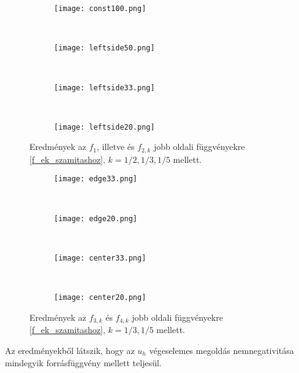 \begin{figure}[ht]
	\begin{subfigure}{.5\textwidth}
		\centerline{\texttt{[image: const100.png]}}
		\label{fig:linu2d}
	\end{subfigure}
	~
	\begin{subfigure}{.5\textwidth}
		\centerline{\texttt{[image: leftside50.png]}}
		\label{fig:linu2d}
	\end{subfigure}
	\\
	\begin{subfigure}{.5\textwidth}
		\centerline{\texttt{[image: leftside33.png]}}
		\label{fig:linu2d}
	\end{subfigure}
	~
	\begin{subfigure}{.5\textwidth}
		\centerline{\texttt{[image: leftside20.png]}}
		\label{fig:linu2d}
	\end{subfigure}
	\caption{Eredmények az $f_1$, illetve és $f_{2,k}$ jobb oldali függvényekre \eqref{f_ek_szamitashoz}, $k = 1/2, 1/3, 1/5$ mellett.}
	\label{fig:f12eredmeny}
\end{figure}

\begin{figure}[ht]
	\begin{subfigure}{.5\textwidth}
		\centerline{\texttt{[image: edge33.png]}}
		\label{fig:linu2d}
	\end{subfigure}
	~
	\begin{subfigure}{.5\textwidth}
		\centerline{\texttt{[image: edge20.png]}}
		\label{fig:linu2d}
	\end{subfigure}
	\\
	\begin{subfigure}{.5\textwidth}
		\centerline{\texttt{[image: center33.png]}}
		\label{fig:linu2d}
	\end{subfigure}
	~
	\begin{subfigure}{.5\textwidth}
		\centerline{\texttt{[image: center20.png]}}
		\label{fig:linu2d}
	\end{subfigure}
	\caption{Eredmények az $f_{3,k}$ és $f_{4,k}$ jobb oldali függvényekre \eqref{f_ek_szamitashoz}, $k = 1/3, 1/5$ mellett.}
	\label{fig:f34eredmeny}
\end{figure}


Az eredményekből látszik, hogy az $u_h$ végeselemes megoldás nemnegativitása mindegyik forrásfüggvény mellett teljesül. 

